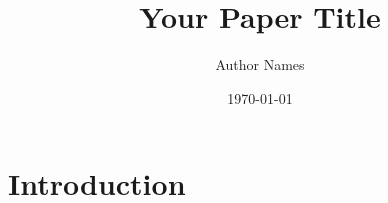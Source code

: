 \documentclass{article}
\begin{document}
\title{Your Paper Title}
\author{Author Names}
\date{\today}
\maketitle

\section{Introduction}
\end{document}
